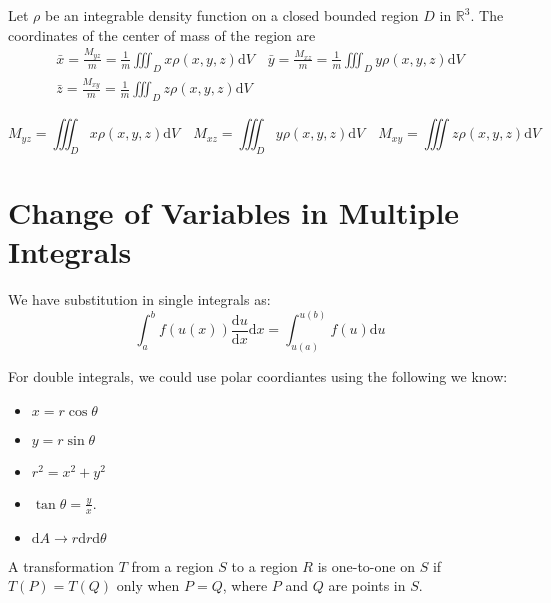 \documentclass[../calc3.tex]{subfiles}
\begin{document}
\begin{definition}
    Let $\rho$ be an integrable density function on a closed bounded region $D$ in $\mathbb{R}^3$. The 
    coordinates of the center of mass of the region are 
    \begin{align*}
        \bar{x}=\frac{M_{yz}}{m}=\frac{1}{m}\iiint_D x\rho(x,y,z)\mathrm{d}V \quad \bar{y}=\frac{M_{xz}}{m}=\frac{1}{m}\iiint_D y\rho(x,y,z)\mathrm{d}V \\
        \bar{z}=\frac{M_{xy}}{m}=\frac{1}{m}\iiint_D z\rho(x,y,z)\mathrm{d}V
    \end{align*}
\end{definition}
\[M_{yz}=\iiint_D x\rho(x,y,z)\mathrm{d}V \quad M_{xz}=\iiint_D y\rho(x,y,z)\mathrm{d}V \quad M_{xy}=\iiint z\rho(x,y,z)\mathrm{d}V\]


\section{Change of Variables in Multiple Integrals}
We have substitution in single integrals as:
\[\int_a^b f(u(x))\frac{\mathrm{d}u}{\mathrm{d}x}\mathrm{d}x = \int^{u(b)}_{u(a)}f(u)\mathrm{d}u\]

For double integrals, we could use polar coordiantes using the following we know:
\begin{itemize}
    \item $x=r\cos\theta$
    \item $y=r\sin\theta$
    \item $r^2=x^2+y^2$
    \item $\tan\theta =\frac{y}{x}$.
    \item $\mathrm{d}A\rightarrow r\mathrm{d}r\mathrm{d}\theta$
\end{itemize}
\pagebreak
\begin{definition}
    A transformation $T$ from a region $S$ to a region $R$ is one-to-one on $S$ if 
    $T(P)=T(Q)$ only when $P=Q$, where $P$ and $Q$ are points in $S$.
\end{definition}
\end{document}
